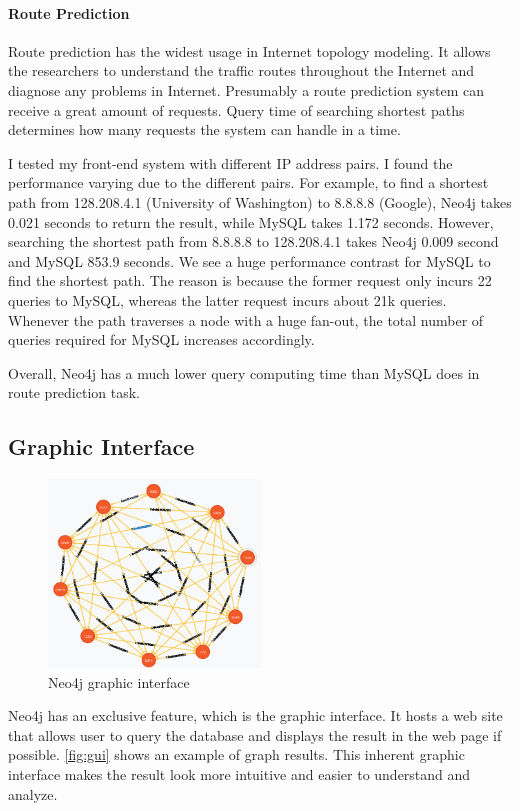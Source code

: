 \documentclass[letterpaper,twocolumn,11pt]{article}
\begin{document}
{\paragraph{Route Prediction} Route prediction has the widest usage in Internet topology modeling. It allows the researchers to understand the traffic routes throughout the Internet and diagnose any problems in Internet. Presumably a route prediction system can receive a great amount of requests. Query time of searching shortest paths determines how many requests the system can handle in a time.

I tested my front-end system with different IP address pairs. I found the performance varying due to the different pairs. For example, to find a shortest path from 128.208.4.1 (University of Washington) to 8.8.8.8 (Google), Neo4j takes 0.021 seconds to return the result, while MySQL takes 1.172 seconds. However, searching the shortest path from 8.8.8.8 to 128.208.4.1 takes Neo4j 0.009 second and MySQL 853.9 seconds. We see a huge performance contrast for MySQL to find the shortest path. The reason is because the former request only incurs 22 queries to MySQL, whereas the latter request incurs about 21k queries. Whenever the path traverses a node with a huge fan-out, the total number of queries required for MySQL increases accordingly. 

Overall, Neo4j has a much lower query computing time than MySQL does in route prediction task.

\subsection{Graphic Interface}

\begin{figure}[t]
\centering
\includegraphics[height=5cm]{figs/gui.png}
\caption{Neo4j graphic interface}
\label{fig:gui}
\end{figure}

Neo4j has an exclusive feature, which is the graphic interface. It hosts a web site that allows user to query the database and displays the result in the web page if possible. \autoref{fig:gui} shows an example of graph results. This inherent graphic interface makes the result look more intuitive and easier to understand and analyze.

}
\end{document}
